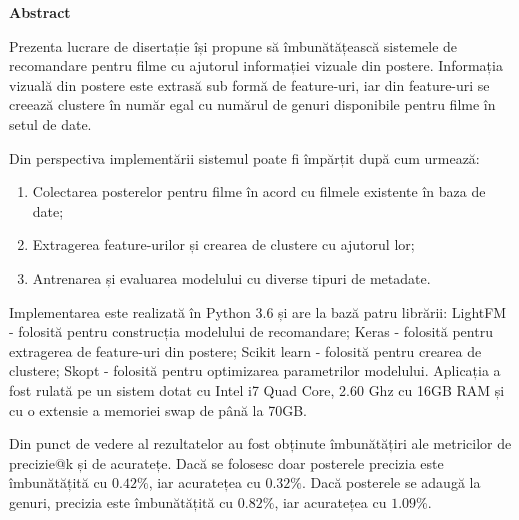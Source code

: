 \thispagestyle{plain}

\begin{center}
	\Large \textbf{Abstract}	
\end{center}

Prezenta lucrare de disertație își propune să îmbunătățească sistemele de recomandare pentru filme cu ajutorul informației vizuale din postere. Informația vizuală din postere este extrasă sub formă de feature-uri, iar din feature-uri se creează clustere în număr egal cu numărul de genuri disponibile pentru filme în setul de date.

\vspace{5mm}
Din perspectiva implementării sistemul poate fi împărțit după cum urmează:
\begin{enumerate}
	\item Colectarea posterelor pentru filme în acord cu filmele existente în baza de date;
	\item Extragerea feature-urilor și crearea de clustere cu ajutorul lor; 
	\item Antrenarea și evaluarea modelului cu diverse tipuri de metadate.
\end{enumerate}

Implementarea este realizată în Python 3.6 și are la bază patru librării: LightFM - folosită pentru construcția modelului de recomandare; Keras - folosită pentru extragerea de feature-uri din postere; Scikit learn - folosită pentru crearea de clustere; Skopt - folosită pentru optimizarea parametrilor modelului. Aplicația a fost rulată pe un sistem dotat cu Intel i7 Quad Core, 2.60 Ghz cu 16GB RAM și cu o extensie a memoriei swap de până la 70GB.

Din punct de vedere al rezultatelor au fost obținute îmbunătățiri ale metricilor de precizie@k și de acuratețe. Dacă se folosesc doar posterele precizia este îmbunătățită cu $0.42\%$, iar acuratețea cu $0.32\%$. Dacă posterele se adaugă la genuri, precizia este îmbunătățită cu $0.82\%$, iar acuratețea cu $1.09\%$.

\vspace*{\fill}
